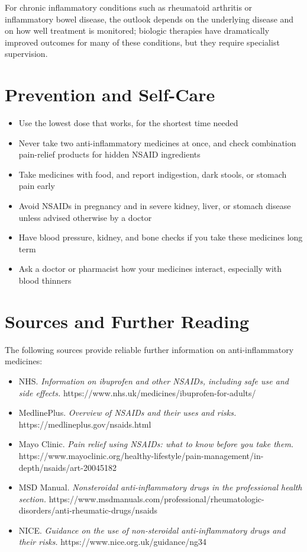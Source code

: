 For chronic inflammatory conditions such as rheumatoid arthritis or inflammatory bowel disease, the outlook depends on the underlying disease and on how well treatment is monitored; biologic therapies have dramatically improved outcomes for many of these conditions, but they require specialist supervision.

\section*{Prevention and Self-Care}
\begin{itemize}
    \item Use the lowest dose that works, for the shortest time needed
    \item Never take two anti-inflammatory medicines at once, and check combination pain-relief products for hidden NSAID ingredients
    \item Take medicines with food, and report indigestion, dark stools, or stomach pain early
    \item Avoid NSAIDs in pregnancy and in severe kidney, liver, or stomach disease unless advised otherwise by a doctor
    \item Have blood pressure, kidney, and bone checks if you take these medicines long term
    \item Ask a doctor or pharmacist how your medicines interact, especially with blood thinners
\end{itemize}

\section*{Sources and Further Reading}
The following sources provide reliable further information on anti-inflammatory medicines:

\begin{itemize}
    \item NHS. \textit{Information on ibuprofen and other NSAIDs, including safe use and side effects.} https://www.nhs.uk/medicines/ibuprofen-for-adults/
    \item MedlinePlus. \textit{Overview of NSAIDs and their uses and risks.} https://medlineplus.gov/nsaids.html
    \item Mayo Clinic. \textit{Pain relief using NSAIDs: what to know before you take them.} https://www.mayoclinic.org/healthy-lifestyle/pain-management/in-depth/nsaids/art-20045182
    \item MSD Manual. \textit{Nonsteroidal anti-inflammatory drugs in the professional health section.} https://www.msdmanuals.com/professional/rheumatologic-disorders/anti-rheumatic-drugs/nsaids
    \item NICE. \textit{Guidance on the use of non-steroidal anti-inflammatory drugs and their risks.} https://www.nice.org.uk/guidance/ng34
\end{itemize}
